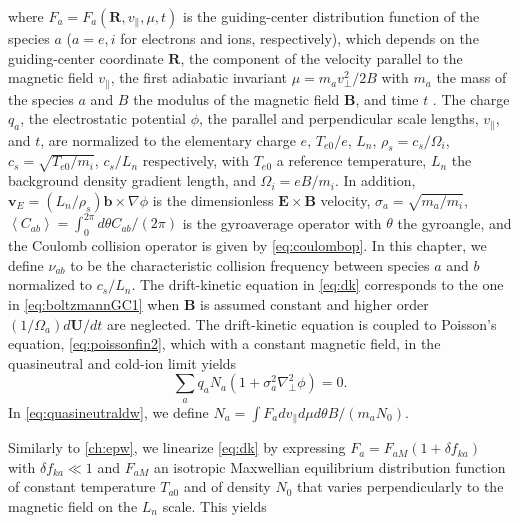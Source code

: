 \noindent where $F_a=F_a(\mathbf R, v_\parallel, \mu, t)$ is the guiding-center distribution function of the species $a$ ($a=e,i$ for electrons and ions, respectively), which depends on the guiding-center coordinate $\mathbf R$, the component of the velocity parallel to the magnetic field $v_\parallel$, the first adiabatic invariant $\mu = m_a v_\perp^2/2 B$ with $m_a$ the mass of the species $a$ and $B$ the modulus of the magnetic field $\mathbf B$, and time $t$ \citep{Hazeltine2003}.
%
The charge $q_a$, the electrostatic potential $\phi$, the parallel and perpendicular scale lengths, $v_\parallel$, and $t$, are normalized to the elementary charge $e$, $T_{e0}/e$, $L_n$, $\rho_s=c_s / \Omega_i$, $c_s=\sqrt{T_{e0}/m_i}$,  $c_s/L_n$ respectively, with $T_{e0}$ a reference temperature, $L_n$ the background density gradient length, and $\Omega_i = e B / m_i$. In addition,  $\mathbf v_E = (L_n/\rho_s) \mathbf b \times \nabla \phi   $ is the dimensionless $\mathbf E \times \mathbf B$ velocity, $\sigma_a = \sqrt{m_a/m_i}$, $\left<C_{ab}\right>=\int_0^{2\pi} d\theta C_{ab}/(2\pi)$ is the gyroaverage operator with $\theta$ the gyroangle, and the Coulomb collision operator is given by \cref{eq:coulombop}.
%
In this chapter, we define $\nu_{ab}$ to be the characteristic collision frequency between species $a$ and $b$ normalized to $c_s/L_n$.
%
The drift-kinetic equation in \cref{eq:dk} corresponds to the one in \cref{eq:boltzmannGC1} when $\mathbf B$ is assumed constant and higher order $(1/\Omega_a)d \mathbf U/dt$ are neglected.
%
The drift-kinetic equation is coupled to Poisson's equation, \cref{eq:poissonfin2}, which with a constant magnetic field, in the quasineutral and cold-ion limit yields
%
\begin{equation}
    \sum_a q_aN_{a}\left(1+\sigma_a^2{\nabla_\perp^2 \phi}{}\right)=0.
\label{eq:quasineutraldw}
\end{equation}
%
In \cref{eq:quasineutraldw}, we define $N_a = \int F_a dv_\parallel d \mu d\theta B/(m_a N_{0})$.

Similarly to \cref{ch:epw}, we linearize \cref{eq:dk} by expressing $F_a = F_{aM}(1 + \delta f_{ka})$ with $\delta f_{ka}\ll 1$ and $F_{aM}$ an isotropic Maxwellian equilibrium distribution function of constant temperature $T_{a0}$ and of density $N_{0}$ that varies perpendicularly to the magnetic field on the $L_n$ scale.
%
This yields


